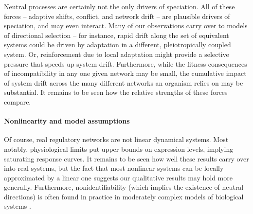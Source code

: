 \documentclass{article}
\newcommand{\1}{\mathbbm{1}}
\begin{document}
Neutral processes are certainly not the only drivers of speciation.
All of these forces -- adaptive shifts, conflict, and network drift --
are plausible drivers of speciation, and may even interact.
Many of our observations carry over to models of directional selection --
for instance, rapid drift along the set of equivalent systems
could be driven by adaptation in a different, pleiotropically coupled system.
Or, reinforcement due to local adaptation might provide a selective pressure
that speeds up system drift.
Furthermore,
while the fitness consequences of incompatibility in any one given network may be small, 
the cumulative impact of system drift across the many different networks an organism relies on may be substantial. 
It remains to be seen how the relative strengths of these forces compare.




\paragraph{Nonlinearity and model assumptions}
Of course, real regulatory networks are not linear dynamical systems.
Most notably, physiological limits put upper bounds on expression levels,
implying saturating response curves.
It remains to be seen how well these results carry over into real systems,
but the fact that most nonlinear systems can be locally approximated by a linear one
suggests our qualitative results may hold more generally.
Furthermore, nonidentifiability (which implies the existence of neutral directions)
is often found in practice in moderately complex models of biological systems \citep{gutenkunst2007universally, piazza2008diverse}.
\end{document}
